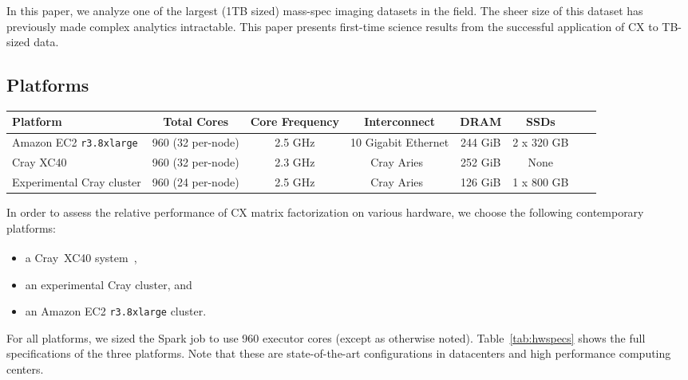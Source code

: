 In this paper, we analyze one of the largest (1TB sized) mass-spec
imaging datasets in the field. The sheer size %
of this dataset
has previously made complex analytics intractable. This paper presents first-time science results from the successful application of CX to TB-sized data.

\subsection{Platforms}

  \begin{table*}
    \begin{center}
    \begin{tabular}{| l | c | c | c | c | c | c | c |}
    \toprule
    \textbf{Platform} & \textbf{Total Cores} & \textbf{Core Frequency} & \textbf{Interconnect} & \textbf{DRAM} & \textbf{SSDs} \\
    \midrule
    Amazon EC2 \texttt{r3.8xlarge} & 960 (32 per-node) & 2.5 GHz & 10 Gigabit Ethernet & 244 GiB & 2 x 320 GB \\
    \midrule
    Cray XC40 & 960 (32 per-node) & 2.3 GHz & Cray Aries~\cite{alverson2012cray,craycascadesc12} & 252 GiB & None \\
    \midrule
    Experimental Cray cluster & 960 (24 per-node) & 2.5 GHz & Cray Aries~\cite{alverson2012cray,craycascadesc12} & 126 GiB & 1 x 800 GB \\
    \bottomrule
    \end{tabular}
    \end{center}
    \caption{Specifications of the three hardware platforms used in these performance experiments.}
    \label{tab:hwspecs}
  \end{table*}

 In order to assess the relative performance of CX matrix factorization on various hardware, we choose the following contemporary platforms:
 \begin{itemize}
 \item a Cray\textregistered~XC40\textsuperscript{\tiny\texttrademark}
 system~\cite{alverson2012cray,craycascadesc12},
 \item an experimental Cray cluster, and
 \item an Amazon EC2 \texttt{r3.8xlarge} cluster.
 \end{itemize}

 For all platforms, we sized the Spark job to use 960 executor cores (except as
 otherwise noted).  Table~\ref{tab:hwspecs} shows the full specifications of
 the three platforms. Note that these are state-of-the-art configurations in
 datacenters and high performance computing centers. 

